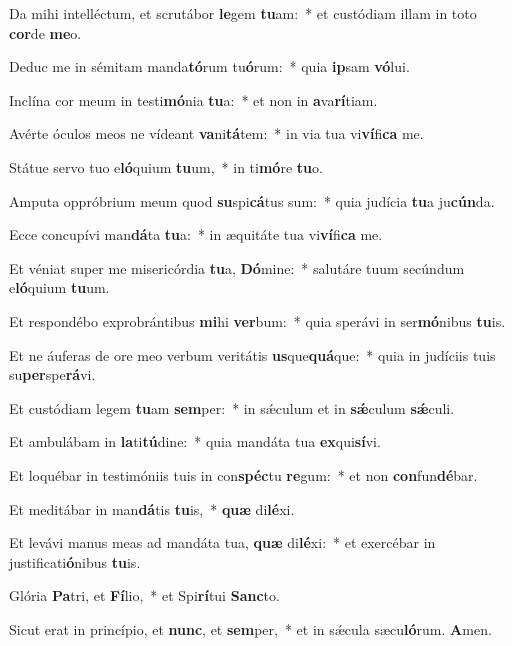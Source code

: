 ﻿\item Da mihi intelléctum, et scrutábor \textbf{le}gem \textbf{tu}am:~* et custódiam illam in toto \textbf{cor}de \textbf{me}o.

\item Deduc me in sémitam manda\textbf{tó}rum tu\textbf{ó}rum:~* quia \textbf{ip}sam \textbf{vó}lui.

\item Inclína cor meum in testi\textbf{mó}nia \textbf{tu}a:~* et non in \textbf{a}va\textbf{rí}tiam.

\item Avérte óculos meos ne vídeant \textbf{va}ni\textbf{tá}tem:~* in via tua vi\textbf{ví}fi\textbf{ca} me.

\item Státue servo tuo e\textbf{ló}quium \textbf{tu}um,~* in ti\textbf{mó}re \textbf{tu}o.

\item Amputa oppróbrium meum quod \textbf{su}spi\textbf{cá}tus sum:~* quia judícia \textbf{tu}a ju\textbf{cún}da.

\item Ecce concupívi man\textbf{dá}ta \textbf{tu}a:~* in æquitáte tua vi\textbf{ví}fi\textbf{ca} me.

\item Et véniat super me misericórdia \textbf{tu}a, \textbf{Dó}mine:~* salutáre tuum secúndum e\textbf{ló}quium \textbf{tu}um.

\item Et respondébo exprobrántibus \textbf{mi}hi \textbf{ver}bum:~* quia sperávi in ser\textbf{mó}nibus \textbf{tu}is.

\item Et ne áuferas de ore meo verbum veritátis \textbf{us}que\textbf{quá}que:~* quia in judíciis tuis su\textbf{per}spe\textbf{rá}vi.

\item Et custódiam legem \textbf{tu}am \textbf{sem}per:~* in sǽculum et in \textbf{sǽ}culum \textbf{sǽ}culi.

\item Et ambulábam in \textbf{la}ti\textbf{tú}dine:~* quia mandáta tua \textbf{ex}qui\textbf{sí}vi.

\item Et loquébar in testimóniis tuis in con\textbf{spéc}tu \textbf{re}gum:~* et non \textbf{con}fun\textbf{dé}bar.

\item Et meditábar in man\textbf{dá}tis \textbf{tu}is,~* \textbf{quæ} di\textbf{lé}xi.

\item Et levávi manus meas ad mandáta tua, \textbf{quæ} di\textbf{lé}xi:~* et exercébar in justificati\textbf{ó}nibus \textbf{tu}is.

\item Glória \textbf{Pa}tri, et \textbf{Fí}lio,~* et Spi\textbf{rí}tui \textbf{Sanc}to.

\item Sicut erat in princípio, et \textbf{nunc}, et \textbf{sem}per,~* et in sǽcula sæcu\textbf{ló}rum. \textbf{A}men.